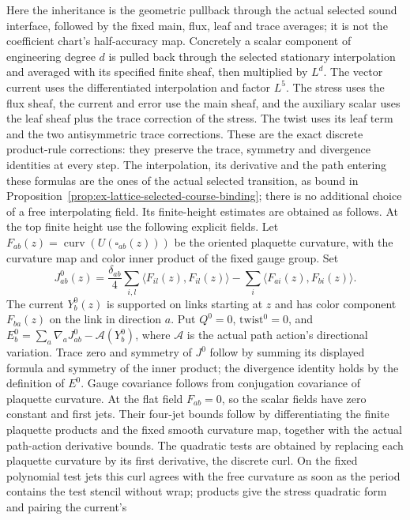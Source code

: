 Here the inheritance is the geometric pullback through the actual
selected sound interface, followed by the fixed main, flux, leaf and trace
averages; it is not the coefficient chart's half-accuracy map.
Concretely a scalar component of engineering degree $d$ is pulled back
through the selected stationary interpolation and averaged with its
specified finite sheaf, then multiplied by $L^d$. The vector current
uses the differentiated interpolation and factor $L^5$. The stress
uses the flux sheaf, the current and error use the main sheaf, and the
auxiliary scalar uses the leaf sheaf plus the trace correction of the
stress. The twist uses its leaf term and the two antisymmetric trace
corrections. These are the exact discrete product-rule corrections:
they preserve the trace, symmetry and divergence identities at every
step. The interpolation, its derivative and the path entering these
formulas are the ones of the actual selected transition, as bound in
Proposition~\ref{prop:ex-lattice-selected-course-binding}; there is
no additional choice of a free interpolating field. Its
finite-height estimates are obtained as follows. At the top finite
height use the following explicit fields. Let
$F_{ab}(z)=\operatorname{curv}(U(\square_{ab}(z)))$ be the oriented
plaquette curvature, with the curvature map and color inner product
of the fixed gauge group. Set
\[
 J^0_{ab}(z)=\frac{\delta_{ab}}4\sum_{i,l}
          \langle F_{il}(z),F_{il}(z)\rangle
        -\sum_i\langle F_{ai}(z),F_{bi}(z)\rangle.
\]
The current $Y^0_b(z)$ is supported on links starting at $z$ and has
color component $F_{ba}(z)$ on the link in direction $a$. Put
$Q^0=0$, $\mathrm{twist}^0=0$, and
$E^0_b=\sum_a\nabla_a J^0_{ab}-\mathcal A(Y^0_b)$, where
$\mathcal A$ is the actual path action's directional variation.
Trace zero and symmetry of $J^0$ follow by summing its displayed
formula and symmetry of the inner product; the divergence identity
holds by the definition of $E^0$. Gauge covariance follows from
conjugation covariance of plaquette curvature. At the flat field
$F_{ab}=0$, so the scalar fields have zero constant and first jets.
Their four-jet bounds follow by differentiating the finite plaquette
products and the fixed smooth curvature map, together with the actual
path-action derivative bounds. The quadratic tests are obtained by
replacing each plaquette curvature by its first derivative, the discrete
curl. On the fixed polynomial test jets this curl agrees with the free
curvature as soon as the period contains the test stencil without wrap;
products give the stress quadratic form and pairing the current's
